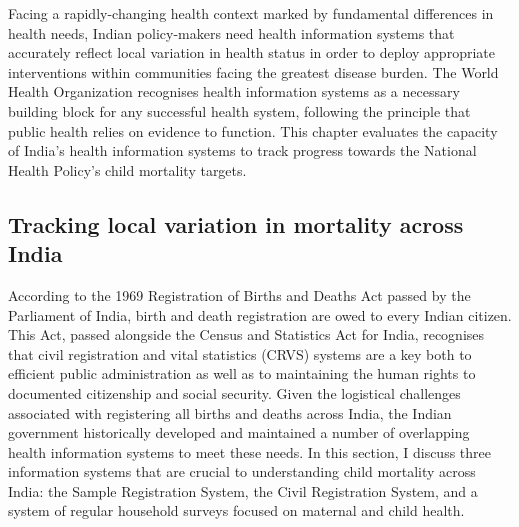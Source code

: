 \documentclass[
]{report}
\begin{document}
Facing a rapidly-changing health context marked by fundamental differences in health needs, Indian policy-makers need health information systems that accurately reflect local variation in health status in order to deploy appropriate interventions within communities facing the greatest disease burden. The World Health Organization recognises health information systems as a necessary building block for any successful health system, following the principle that public health relies on evidence to function.\autocite{WorldHealthOrganization2010,Abouzahr2005} This chapter evaluates the capacity of India's health information systems to track progress towards the National Health Policy's child mortality targets.

\hypertarget{tracking-local-variation-in-mortality-across-india}{%
\subsection{Tracking local variation in mortality across India}\label{tracking-local-variation-in-mortality-across-india}}

According to the 1969 Registration of Births and Deaths Act passed by the Parliament of India, birth and death registration are owed to every Indian citizen.\autocite{ParliamentoftheRepublicofIndia1969} This Act, passed alongside the Census and Statistics Act for India,\autocite{Subramanian1969} recognises that civil registration and vital statistics (CRVS) systems are a key both to efficient public administration as well as to maintaining the human rights to documented citizenship and social security.\autocite{srs} Given the logistical challenges associated with registering all births and deaths across India, the Indian government historically developed and maintained a number of overlapping health information systems to meet these needs. In this section, I discuss three information systems that are crucial to understanding child mortality across India: the Sample Registration System, the Civil Registration System, and a system of regular household surveys focused on maternal and child health.
\end{document}

